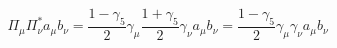 \begin{equation} 
\Pi_{\mu} \Pi_{\nu}^{*} a_{\mu} b_{\nu} =  
\frac{1- \gamma_{5}}{2} \gamma_{\mu} \frac{1+ \gamma_{5}}{2} \gamma_{\nu} 
a_{\mu} b_{\nu} = \frac{1- \gamma_{5}}{2} \gamma_{\mu} \gamma_{\nu} 
a_{\mu} b_{\nu} 
\end{equation} 
